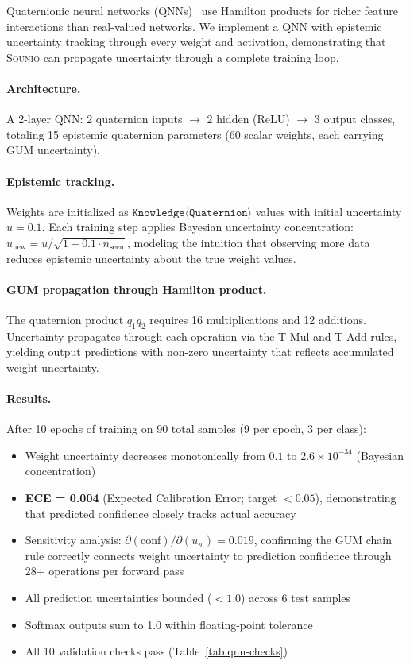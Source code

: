 \documentclass[acmsmall,screen,review,anonymous]{acmart}
\newcommand{\sounio}{\textsc{Sounio}\xspace}
\newcommand{\know}[1]{\texttt{Knowledge}\langle #1 \rangle}
\begin{document}
Quaternionic neural networks (QNNs)~\cite{parcollet2019quaternion} use
Hamilton products for richer feature interactions than real-valued networks.
We implement a QNN with epistemic uncertainty tracking through every
weight and activation, demonstrating that \sounio can propagate
uncertainty through a complete training loop.

\paragraph{Architecture.}
A 2-layer QNN: 2 quaternion inputs $\to$ 2 hidden (ReLU) $\to$ 3 output
classes, totaling 15 epistemic quaternion parameters (60 scalar weights,
each carrying GUM uncertainty).

\paragraph{Epistemic tracking.}
Weights are initialized as $\know{\texttt{Quaternion}}$ values with
initial uncertainty $u = 0.1$.
Each training step applies Bayesian uncertainty concentration:
$u_{\text{new}} = u / \sqrt{1 + 0.1 \cdot n_{\text{seen}}}$,
modeling the intuition that observing more data reduces epistemic
uncertainty about the true weight values.

\paragraph{GUM propagation through Hamilton product.}
The quaternion product $q_1 q_2$ requires 16 multiplications and 12
additions.
Uncertainty propagates through each operation via the T-Mul and T-Add
rules, yielding output predictions with non-zero uncertainty that
reflects accumulated weight uncertainty.

\paragraph{Results.}
After 10 epochs of training on 90 total samples (9 per epoch, 3 per class):
\begin{itemize}
  \item Weight uncertainty decreases monotonically from $0.1$ to
        $2.6 \times 10^{-34}$ (Bayesian concentration)
  \item \textbf{ECE = 0.004} (Expected Calibration Error; target $< 0.05$),
        demonstrating that predicted confidence closely tracks actual accuracy
  \item Sensitivity analysis: $\partial(\text{conf})/\partial(u_w) = 0.019$,
        confirming the GUM chain rule correctly connects weight uncertainty
        to prediction confidence through 28+ operations per forward pass
  \item All prediction uncertainties bounded ($< 1.0$) across 6 test samples
  \item Softmax outputs sum to 1.0 within floating-point tolerance
  \item All 10 validation checks pass (Table~\ref{tab:qnn-checks})
\end{itemize}
\end{document}
